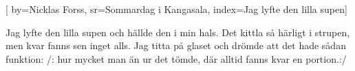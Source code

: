 [
	by={Nicklas Forss},
	sr={Sommardag i Kangasala},
	index={Jag lyfte den lilla supen}]
	
\beginverse*						
Jag lyfte den lilla supen
och hällde den i min hals.
Det kittla så härligt i strupen,
men kvar fanns sen inget alls.
Jag titta på glaset och drömde
att det hade sådan funktion:
/: hur mycket man än ur det tömde,
där alltid fanns kvar en portion.:/
\endverse						
\endsong		
